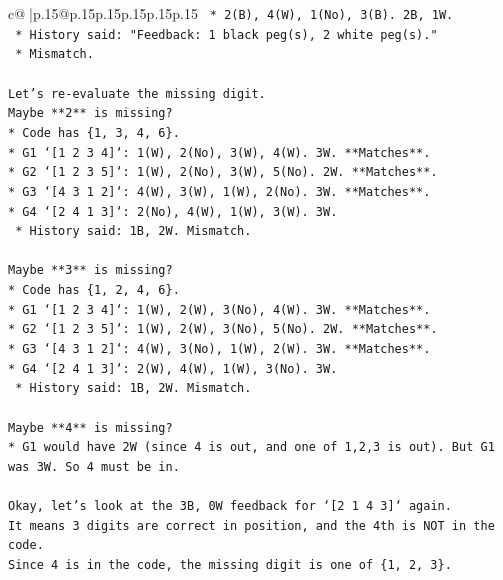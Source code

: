 \documentclass{article}
\begin{document}
{\begin{supertabular}{c@{$\;$}|p{.15\linewidth}@{}p{.15\linewidth}p{.15\linewidth}p{.15\linewidth}p{.15\linewidth}p{.15\linewidth}}
{{{\texttt{                        *   2(B), 4(W), 1(No), 3(B). 2B, 1W.} \\
\texttt{                        *   History said: "Feedback: 1 black peg(s), 2 white peg(s)."} \\
\texttt{                        *   Mismatch.} \\
\\ 
\texttt{Let's re{-}evaluate the missing digit.} \\
\texttt{Maybe **2** is missing?} \\
\texttt{*   Code has \{1, 3, 4, 6\}.} \\
\texttt{*   G1 `{[}1 2 3 4{]}`: 1(W), 2(No), 3(W), 4(W). 3W. **Matches**.} \\
\texttt{*   G2 `{[}1 2 3 5{]}`: 1(W), 2(No), 3(W), 5(No). 2W. **Matches**.} \\
\texttt{*   G3 `{[}4 3 1 2{]}`: 4(W), 3(W), 1(W), 2(No). 3W. **Matches**.} \\
\texttt{*   G4 `{[}2 4 1 3{]}`: 2(No), 4(W), 1(W), 3(W). 3W.} \\
\texttt{    *   History said: 1B, 2W. Mismatch.} \\
\\ 
\texttt{Maybe **3** is missing?} \\
\texttt{*   Code has \{1, 2, 4, 6\}.} \\
\texttt{*   G1 `{[}1 2 3 4{]}`: 1(W), 2(W), 3(No), 4(W). 3W. **Matches**.} \\
\texttt{*   G2 `{[}1 2 3 5{]}`: 1(W), 2(W), 3(No), 5(No). 2W. **Matches**.} \\
\texttt{*   G3 `{[}4 3 1 2{]}`: 4(W), 3(No), 1(W), 2(W). 3W. **Matches**.} \\
\texttt{*   G4 `{[}2 4 1 3{]}`: 2(W), 4(W), 1(W), 3(No). 3W.} \\
\texttt{    *   History said: 1B, 2W. Mismatch.} \\
\\ 
\texttt{Maybe **4** is missing?} \\
\texttt{*   G1 would have 2W (since 4 is out, and one of 1,2,3 is out). But G1 was 3W. So 4 must be in.} \\
\\ 
\texttt{Okay, let's look at the 3B, 0W feedback for `{[}2 1 4 3{]}` again.} \\
\texttt{It means 3 digits are correct in position, and the 4th is NOT in the code.} \\
\texttt{Since 4 is in the code, the missing digit is one of \{1, 2, 3\}.} \\
}}}
\end{supertabular}}
\end{document}
